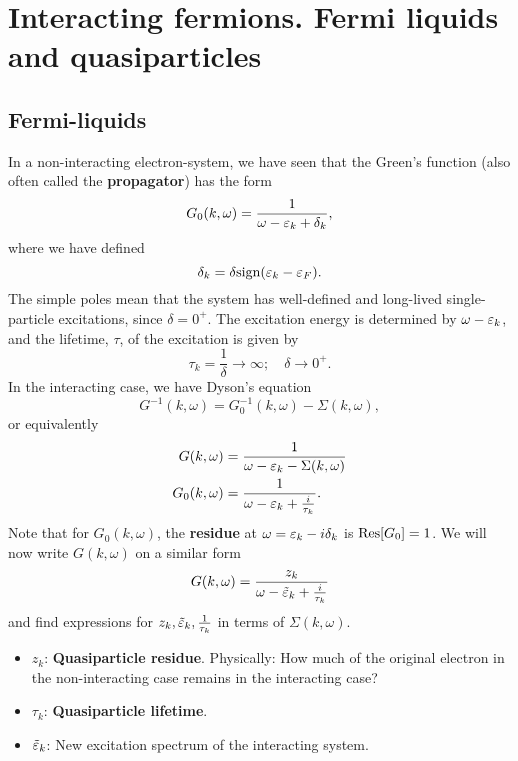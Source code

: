 \chapter{Interacting fermions. Fermi liquids and quasiparticles}

\section{Fermi-liquids}

In a non-interacting electron-system, we have seen that the Green's function (also often called the \textbf{propagator}) has the form 
\begin{equation} 
G_0(k,\omega) = \frac{1}{\omega-\varepsilon_k + \delta_k},
\end{equation}
where we have defined 
\begin{equation} 
\delta_k = \delta\text{sign}(\varepsilon_k-\varepsilon_F).
\end{equation}
The simple poles mean that the system has well-defined and long-lived single-particle excitations, since $\delta = 0^+$. The excitation energy is determined by $\omega-\varepsilon_k$, and the lifetime, $\tau$, of the excitation is given by 
\begin{equation} 
\tau_k =\frac{1}{\delta} \rightarrow \infty ; \quad \delta\rightarrow0^+.
\end{equation}
In the interacting case, we have Dyson's equation
\begin{equation} 
G^{-1}(k,\omega) = G_0^{-1}(k,\omega) - \Sigma(k,\omega),
\end{equation}
or equivalently
\begin{align} 
G(k,\omega) &= \frac{1}{\omega - \varepsilon_k - \Sigma(k,\omega)} \\
G_0(k,\omega) &= \frac{1}{\omega - \varepsilon_k+\frac{i}{\tau_k}}. 
\end{align}
Note that for $G_0(k,\omega)$, the \textbf{residue} at $\omega = \varepsilon_k-i\delta_k$ is $\Res[G_0] = 1$. 
We will now write $G(k, \omega)$ on a similar form 
\begin{equation} 
G(k,\omega) = \frac{z_k}{\omega-\tilde{\varepsilon}_k  + \frac{i}{\tau_k}}
\end{equation}
and find expressions for $z_k, \tilde{\varepsilon}_k, \frac{1}{\tau_k}$ in terms of $\Sigma(k,\omega)$. 
\begin{itemize}
	\item $z_k$: \textbf{Quasiparticle residue}. Physically: How much of the original electron in the non-interacting case remains in the interacting case?
	\item $\tau_k$: \textbf{Quasiparticle lifetime}. 
	\item $\tilde{\varepsilon}_k$: New excitation spectrum of the interacting system.
\end{itemize}
